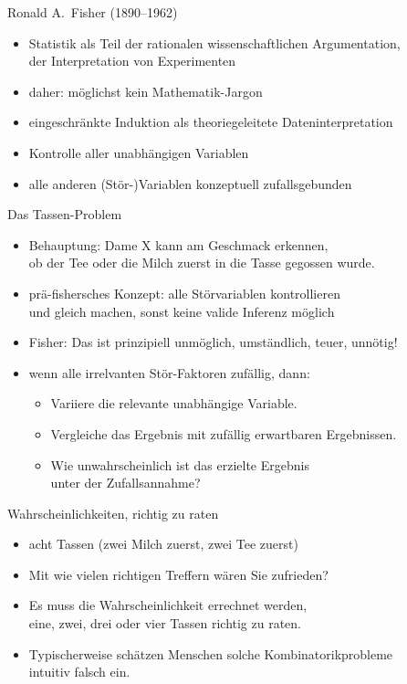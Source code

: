 \begin{frame}
  {Ronald A.\ Fisher (1890--1962)}
  \begin{itemize}[<+->]
    \item Statistik als Teil der rationalen wissenschaftlichen Argumentation,\\
      der Interpretation von Experimenten
    \item daher: möglichst kein Mathematik-Jargon
    \item eingeschränkte Induktion als theoriegeleitete Dateninterpretation
    \item Kontrolle aller unabhängigen Variablen
    \item \alert{alle anderen (Stör-)Variablen konzeptuell zufallsgebunden}
  \end{itemize}
\end{frame}

\begin{frame}
  {Das Tassen-Problem}
  \begin{itemize}[<+->]
    \item Behauptung: Dame X kann am Geschmack erkennen,\\
      ob der Tee oder die Milch zuerst in die Tasse gegossen wurde.
    \item prä-fishersches Konzept: \alert{alle Störvariablen kontrollieren}\\
      und gleich machen, sonst keine valide Inferenz möglich
    \item Fisher: Das ist prinzipiell unmöglich, umständlich, teuer, \alert{unnötig}!
    \item wenn alle irrelvanten Stör-Faktoren zufällig, dann:
      \begin{itemize}[<+->]
	\item Variiere die relevante unabhängige Variable.
	\item Vergleiche das Ergebnis mit zufällig erwartbaren Ergebnissen.
	\item \alert{Wie unwahrscheinlich ist das erzielte Ergebnis\\
	  unter der Zufallsannahme?}
      \end{itemize}
  \end{itemize}
\end{frame}

\begin{frame}
  {Wahrscheinlichkeiten, richtig zu raten}
  \begin{itemize}[<+->]
    \item acht Tassen (zwei Milch zuerst, zwei Tee zuerst)
    \item \alert{Mit wie vielen richtigen Treffern wären Sie zufrieden?}
      \pause
      \pause
    \item Es muss die Wahrscheinlichkeit errechnet werden,\\
      eine, zwei, drei oder vier Tassen richtig zu raten.
      \Zeile
    \item \alert{Typischerweise schätzen Menschen solche Kombinatorikprobleme\\
      intuitiv falsch ein.}
  \end{itemize}
\end{frame}

